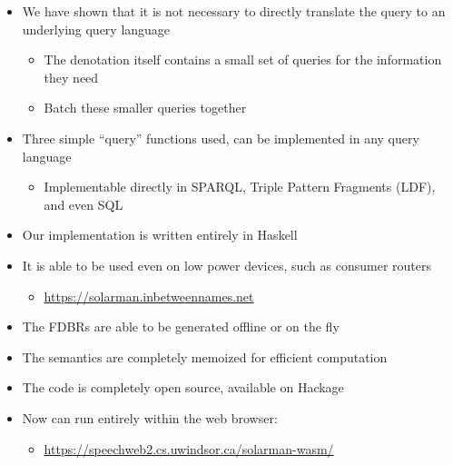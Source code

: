 \documentclass[logoontitle,tabu,supertabular,aspectratio=43]{preney-uwindsor-beamer}
\begin{document}
	\begin{frame}{\insertsection}
		\begin{itemize}
			\item We have shown that it is not necessary to directly translate the query to an underlying query language \cite{frost2014demonstration}
			\begin{itemize}
				\item The denotation itself contains a small set of queries for the information they need
				\item Batch these smaller queries together
			\end{itemize}
			\item Three simple ``query'' functions used, can be implemented in any query language
			\begin{itemize}
				\item Implementable directly in SPARQL, Triple Pattern Fragments (LDF), and even SQL
			\end{itemize}
		\end{itemize}
	\end{frame}

	\begin{frame}{\insertsection}
		\begin{itemize}
			\item Our implementation is written entirely in Haskell
			\item It is able to be used even on low power devices, such as consumer routers
			\begin{itemize}
				\item \url{https://solarman.inbetweennames.net}
			\end{itemize}
			\item The FDBRs are able to be generated offline or on the fly
			\item The semantics are completely memoized for efficient computation
			\item The code is completely open source, available on Hackage \cite{xsaiga}
            \item Now can run entirely within the web browser:
            \begin{itemize}
                \item \url{https://speechweb2.cs.uwindsor.ca/solarman-wasm/}
            \end{itemize}
		\end{itemize}
	\end{frame}
\end{document}
